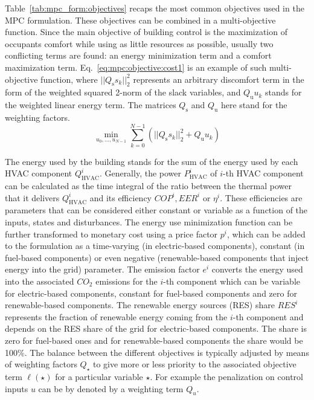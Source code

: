 \documentclass[10pt]{article}
\begin{document}
Table~\ref{tab:mpc_form:objectives} recaps the most common objectives used 
in the MPC formulation. These objectives can be combined in a multi-objective function. 
% 
Since the main objective of building control is the maximization of occupants comfort while using as little resources as possible,
usually two conflicting terms are found: an energy minimization term
and a comfort maximization term.  
% 
Eq.~\eqref{eq:mpc:objective:cost1} is an example of such
 multi-objective function,
where $||{Q_{\text{s}} s_{k}}||_2^2$ represents an arbitrary discomfort term in the form of the weighted squared 2-norm of the slack variables, and ${Q_{\text{u}} u_{k}}$ stands for the weighted linear energy term. The matrices $Q_{\text{s}}$ and $Q_{\text{u}}$ here stand for the weighting factors.
\begin{equation}
\min_{u_0, \ldots, u_{N-1}}  
\sum_{k=0}^{N-1} (||{Q_{\text{s}} s_{k} }||_2^2
+ {Q_{\text{u}}  u_{k}}) \label{eq:mpc:objective:cost1}
\end{equation}
% 
 
The energy used by the building stands for the sum of the energy used by each HVAC component $Q^i_{\text{HVAC}}$.
Generally, the power $P^i_{\text{HVAC}}$ of $i$-th HVAC component can be calculated as the time integral of the
ratio between the thermal power that it delivers $Q^i_{\text{HVAC}}$ and its efficiency $COP^i, EER^i$ or $\eta^i$. 
These efficiencies are parameters that can be considered either constant or variable
as a function of the inputs, states and disturbances.
The energy use
minimization function can be further transformed to monetary cost  using a price factor  $p^i$, which can be added to the formulation 
as a time-varying (in electric-based components), constant (in fuel-based components) or even negative 
(renewable-based components that inject energy into the grid) parameter.
The emission factor $e^i$ converts the energy used into the associated $CO_2$ emissions 
for the $i$-th component which can be variable for electric-based components,
constant for fuel-based components and zero for renewable-based components.
The renewable energy sources (RES) share $RES^i$ represents the fraction of renewable
energy coming from the  $i$-th component and depends on the RES share of the grid for
electric-based components. The share is zero for fuel-based ones and for
renewable-based components the share would be 100\%.
% 
The balance between the different objectives is typically adjusted
by means of weighting factors $Q_{\star}$ to give more or less priority to the associated objective term $\ell({\star})$ for a particular variable $\star$. For example the penalization on control inputs $u$ can be by denoted by a weighting term $Q_{u}$.
\end{document}
